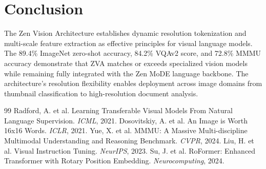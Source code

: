 \documentclass[11pt,a4paper]{article}
\begin{document}
\section{Conclusion}

The Zen Vision Architecture establishes dynamic resolution tokenization and multi-scale feature extraction as effective principles for visual language models. The 89.4\% ImageNet zero-shot accuracy, 84.2\% VQAv2 score, and 72.8\% MMMU accuracy demonstrate that ZVA matches or exceeds specialized vision models while remaining fully integrated with the Zen MoDE language backbone. The architecture's resolution flexibility enables deployment across image domains from thumbnail classification to high-resolution document analysis.

\begin{thebibliography}{99}
 Radford, A. et al. Learning Transferable Visual Models From Natural Language Supervision. \textit{ICML}, 2021.
 Dosovitskiy, A. et al. An Image is Worth 16x16 Words. \textit{ICLR}, 2021.
 Yue, X. et al. MMMU: A Massive Multi-discipline Multimodal Understanding and Reasoning Benchmark. \textit{CVPR}, 2024.
 Liu, H. et al. Visual Instruction Tuning. \textit{NeurIPS}, 2023.
 Su, J. et al. RoFormer: Enhanced Transformer with Rotary Position Embedding. \textit{Neurocomputing}, 2024.
\end{thebibliography}
\end{document}
